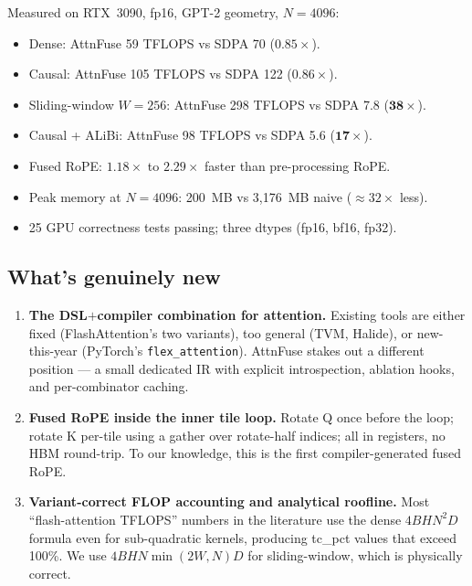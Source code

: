 \documentclass[11pt]{article}
\begin{document}
Measured on RTX~3090, fp16, GPT-2 geometry, $N = 4096$:

\begin{itemize}[leftmargin=1.4em,itemsep=1pt]
  \item Dense: AttnFuse 59 TFLOPS vs SDPA 70 ($0.85\times$).
  \item Causal: AttnFuse 105 TFLOPS vs SDPA 122 ($0.86\times$).
  \item Sliding-window $W{=}256$: AttnFuse 298 TFLOPS vs SDPA 7.8 ($\mathbf{38\times}$).
  \item Causal + ALiBi: AttnFuse 98 TFLOPS vs SDPA 5.6 ($\mathbf{17\times}$).
  \item Fused RoPE: $1.18\times$ to $2.29\times$ faster than pre-processing RoPE.
  \item Peak memory at $N{=}4096$: 200~MB vs 3,176~MB naive ($\approx 32\times$ less).
  \item 25 GPU correctness tests passing; three dtypes (fp16, bf16, fp32).
\end{itemize}

\subsection{What's genuinely new}

\begin{enumerate}[leftmargin=1.4em,itemsep=2pt]
  \item \textbf{The DSL$+$compiler combination for attention.} Existing tools
        are either fixed (FlashAttention's two variants), too general
        (TVM, Halide), or new-this-year (PyTorch's \texttt{flex\_attention}).
        AttnFuse stakes out a different position --- a small dedicated IR
        with explicit introspection, ablation hooks, and per-combinator
        caching.
  \item \textbf{Fused RoPE inside the inner tile loop.} Rotate Q once before
        the loop; rotate K per-tile using a gather over rotate-half indices;
        all in registers, no HBM round-trip. To our knowledge, this is the
        first compiler-generated fused RoPE.
  \item \textbf{Variant-correct FLOP accounting and analytical roofline.}
        Most ``flash-attention TFLOPS'' numbers in the literature use the
        dense $4BHN^2D$ formula even for sub-quadratic kernels, producing
        tc\_pct values that exceed 100\%. We use $4BHN\min(2W,N)D$ for
        sliding-window, which is physically correct.
\end{enumerate}
\end{document}
